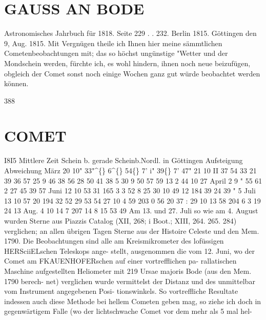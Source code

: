 \documentclass[12pt,a4paper]{article}
\newcommand{\degree}{\textdegree}
\begin{document}
\section*{GAUSS  AN  BODE}
Astronomisches  Jahrbuch  für  1818.     Seite  229  . .  232.     Berlin  1815. 
Göttingen  den  9,  Aug.  1815. 
Mit  Vergnügen  theile  ich   Ihnen  hier    meine   sämmtlichen   Cometenbeobachtungen  mit;     das  so 
höchst  ungünstige  "Wetter  und  der  Mondschein  werden,  fürchte  ich,   es  wohl  hindern,   ihnen  noch  neue 
beizufügen,  obgleich  der  Comet  sonst  noch  einige  Wochen  ganz   gut   würde  beobachtet  werden  können. 


\newpage
388 

\section*{COMET}
I8I5 
Mittlere Zeit Schein b.  gerade Scheinb.Nordl. 
in  Göttingen 
Aufsteigung 
Abweichung 
März    20 
10"  33"\textasciicircum\{\} 
6\textasciicircum\{\} 
54\degree\{\}     7'      i" 
39\degree\{\}     7'    47" 
21 
10     II 
37 
54     33     21 
39     36     57 
25 
9     46 
38 
56     28     50 
41     38       5 
30 
9     50 
57 
59     13       2 
44     10     27 
April     2 
9     " 
55 
61       2     27 
45     39     57 
Juni     12 
10     53 
31 
165       3       3 
52       8     25 
30 
10     49 
12 
184     39     24 
39     "       5 
Juli      13 
10     57 
20 
194     32     52 
29     53     54 
27 
10       4 
59 
203       0     56 
20     37      : 
29 
10     13 
58 
204       6       3 
19     24     13 
Aug.      4 
10     14 
7 
207     14       8 
15     53     49 
Am  13.  und  27.  Juli  so  wie  am  4.  August  wurden  Sterne  aus  Piazzis  Catalog  (XII,  268;  i  Boot.; 
XIII,  264.  265.  284)  verglichen;  an  allen  übrigen  Tagen  Sterne  aus  der  Histoire  Celeste  und  den  Mem. 
1790.  Die  Beobachtungen  sind  alle  am  Kreismikrometer  des  lofüssigen  HERSciiELschen  Teleskops  ange- 
stellt, ausgenommen  die  vom  12.  Juni,  wo  der  Comet  am  FKAUENHOFERschen  auf  einer  vortrefflichen  pa- 
rallatischen  Maschine  aufgestellten  Heliometer  mit  219  Ursae  majoris  Bode  (aus  den  Mem.  1790  berech- 
net) verglichen  wurde  vermittelst  der  Distanz  und  des  unmittelbar  vom  Instrument  angegebenen  Posi- 
tionswinkels. So  vortreffliche  Resultate  indessen  auch  diese  Methode  bei  hellem  Cometen  geben  mag, 
so  ziehe  ich  doch  in  gegenwärtigem  Falle  (wo  der  lichtschwache  Comet  vor  dem  mehr  als  5  mal  hel- 
\end{document}
